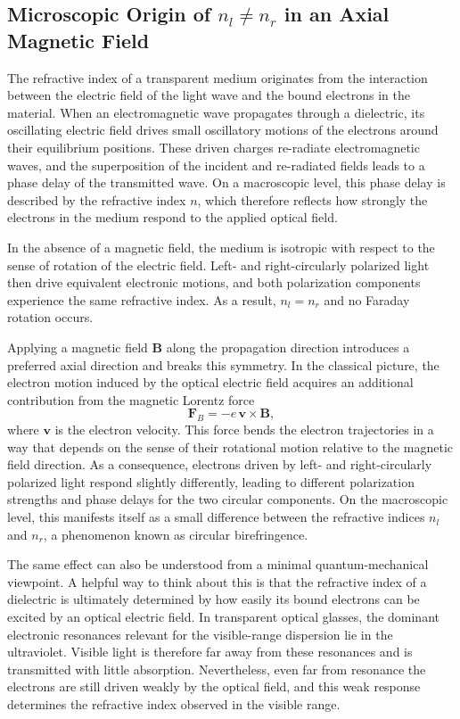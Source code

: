 \documentclass[a4paper]{article}
\begin{document}
\subsection{Microscopic Origin of \texorpdfstring{$n_l \neq n_r$}{} in an Axial Magnetic Field}
\label{sec:microscopic_origin}

The refractive index of a transparent medium originates from the interaction between the electric field of the light wave and the bound electrons in the material.
When an electromagnetic wave propagates through a dielectric, its oscillating electric field drives small oscillatory motions of the electrons around their equilibrium positions.
These driven charges re-radiate electromagnetic waves, and the superposition of the incident and re-radiated fields leads to a phase delay of the transmitted wave.
On a macroscopic level, this phase delay is described by the refractive index $n$, which therefore reflects how strongly the electrons in the medium respond to the applied optical field.

In the absence of a magnetic field, the medium is isotropic with respect to the sense of rotation of the electric field.
Left- and right-circularly polarized light then drive equivalent electronic motions, and both polarization components experience the same refractive index.
As a result, $n_l = n_r$ and no Faraday rotation occurs.

Applying a magnetic field $\mathbf{B}$ along the propagation direction introduces a preferred axial direction and breaks this symmetry.
In the classical picture, the electron motion induced by the optical electric field acquires an additional contribution from the magnetic Lorentz force
\[
  \mathbf{F}_B = -e\,\mathbf{v} \times \mathbf{B},
\]
where $\mathbf{v}$ is the electron velocity.
This force bends the electron trajectories in a way that depends on the sense of their rotational motion relative to the magnetic field direction.
As a consequence, electrons driven by left- and right-circularly polarized light respond slightly differently, leading to different polarization strengths and phase delays for the two circular components.
On the macroscopic level, this manifests itself as a small difference between the refractive indices $n_l$ and $n_r$, a phenomenon known as circular birefringence.

The same effect can also be understood from a minimal quantum-mechanical viewpoint.
A helpful way to think about this is that the refractive index of a dielectric is ultimately determined by how easily its bound electrons can be excited by an optical electric field.
In transparent optical glasses, the dominant electronic resonances relevant for the visible-range dispersion lie in the ultraviolet.
Visible light is therefore far away from these resonances and is transmitted with little absorption.
Nevertheless, even far from resonance the electrons are still driven weakly by the optical field, and this weak response determines the refractive index observed in the visible range.
\end{document}
